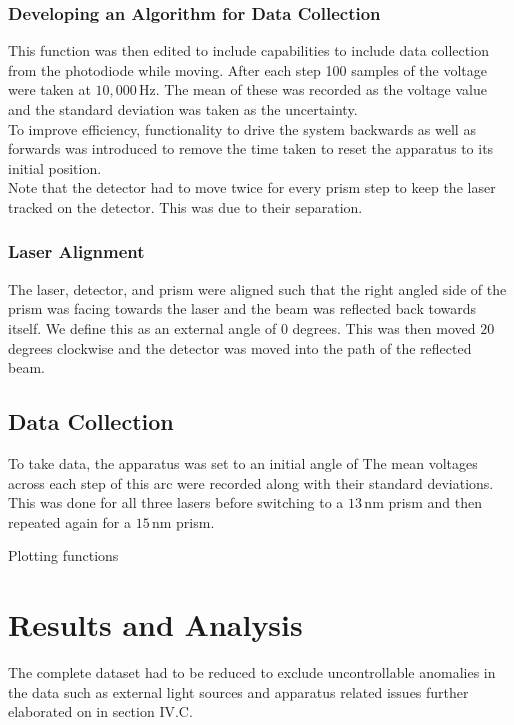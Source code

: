 \documentclass[%
reprint,
amsmath,amssymb,
aps,
]{revtex4-2}
\begin{document}
			\subsubsection{Developing an Algorithm for Data Collection}
				This function was then edited to include capabilities to include data collection from the photodiode while moving. After each step 100 samples of the voltage were taken at $10,000\,\text{Hz}$. The mean of these was recorded as the voltage value and the standard deviation was taken as the uncertainty.\\
				
				To improve efficiency, functionality to drive the system backwards as well as forwards was introduced to remove the time taken to reset the apparatus to its initial position.\\
				
				Note that the detector had to move twice for every prism step to keep the laser tracked on the detector. This was due to their separation.

			\subsubsection{Laser Alignment}
				The laser, detector, and prism were aligned such that the right angled side of the prism was facing towards the laser and the beam was reflected back towards itself. We define this as an external angle of $0$ degrees. This was then moved $20$ degrees clockwise and the detector was moved into the path of the reflected beam.
			
		\subsection{Data Collection}
			To take data, the apparatus was set to an initial angle of 
			The mean voltages across each step of this arc were recorded along with their standard deviations. This was done for all three lasers before switching to a $13\,\text{nm}$ prism and then repeated again for a $15\,\text{nm}$ prism.
			
			Plotting functions
		
		
	
	\section{Results and Analysis}
		The complete dataset had to be reduced to exclude uncontrollable anomalies in the data such as external light sources and apparatus related issues further elaborated on in section IV.C.
		
\end{document}
